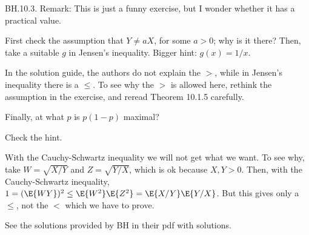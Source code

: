 
\setcounter{theorem}{2}
\begin{exercise} BH.10.3.
Remark: This is just a funny exercise, but I wonder whether it has a practical value.
\begin{hint}
First check the assumption that $Y\neq a X$, for some $a>0$; why is it there?
Then, take a suitable $g$ in Jensen's inequality.
Bigger hint: $g(x)=1/x$.

In the solution guide, the authors do not explain the $>$, while in Jensen's inequality there is a $\leq$.
To see why the $>$ is allowed here, rethink the assumption in the exercise, and reread Theorem 10.1.5 carefully.

Finally, at what $p$ is $p(1-p)$ maximal?
\end{hint}
\begin{solution}
Check the hint.

With the Cauchy-Schwartz inequality we will not get what we want. To see why, take $W=\sqrt{X/Y}$ and $Z=\sqrt{Y/X}$, which is ok because $X,Y>0$.  Then, with the Cauchy-Schwartz inequality, $1 = (\E{WY})^{2} \leq \E{W^2}\E{Z^{2}} = \E{X/Y}\E{Y/X}$. But this gives only a $\leq$, not the $<$ which we have to prove.

See the solutions provided by BH in their pdf with solutions.
\end{solution}

\end{exercise}

